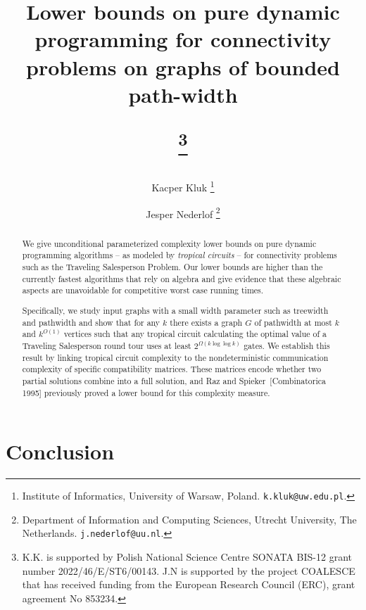 \documentclass[11pt,a4paper]{article}
\begin{document}
\iftrue
\author{
  Kacper Kluk%
  \thanks{Institute of Informatics, University of Warsaw, Poland. \texttt{k.kluk@uw.edu.pl}.}
  \and%
  Jesper Nederlof%
  \thanks{Department of Information and Computing Sciences, Utrecht University, The Netherlands. \texttt{j.nederlof@uu.nl}.}
}
\else
\author{}
\fi

\title{Lower bounds on pure dynamic programming for connectivity problems on graphs of bounded path-width
\iftrue
  \thanks{
  K.K. is supported by Polish National Science Centre SONATA BIS-12 grant number 2022/46/E/ST6/00143. J.N is supported by the project COALESCE that has received funding from the European Research Council (ERC), grant agreement No 853234.}\fi}

\date{}
\maketitle

\begin{abstract}
We give unconditional parameterized complexity lower bounds on pure dynamic programming algorithms -- as modeled by \emph{tropical circuits} -- for connectivity problems such as the Traveling Salesperson Problem. Our lower bounds are higher than the currently fastest algorithms that rely on algebra and give evidence that these algebraic aspects are unavoidable for competitive worst case running times. 

Specifically, we study input graphs with a small width parameter such as treewidth and pathwidth and show that for any $k$ there exists a graph $G$ of pathwidth at most $k$ and $k^{O(1)}$ vertices such that any tropical circuit calculating the optimal value of a Traveling Salesperson round tour uses at least $2^{\Omega(k \log \log k)}$ gates. We establish this result by linking tropical circuit complexity to the nondeterministic communication complexity of specific compatibility matrices. These matrices encode whether two partial solutions combine into a full solution, and Raz and Spieker~[Combinatorica 1995] previously proved a lower bound for this complexity measure.
\end{abstract}











\section{Conclusion}
\label{sec:con}
\end{document}
